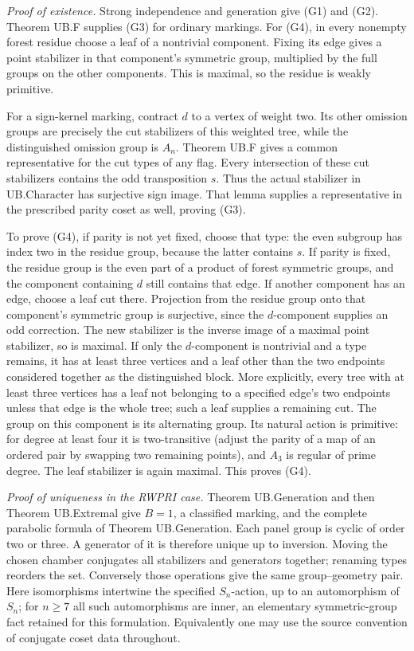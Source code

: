 \emph{Proof of existence.} Strong independence and generation give (G1) and (G2). Theorem UB.F supplies (G3) for ordinary markings. For (G4), in every nonempty forest residue choose a leaf of a nontrivial component. Fixing its edge gives a point stabilizer in that component's symmetric group, multiplied by the full groups on the other components. This is maximal, so the residue is weakly primitive.

For a sign-kernel marking, contract \(d\) to a vertex of weight two. Its other omission groups are precisely the cut stabilizers of this weighted tree, while the distinguished omission group is \(A_n\). Theorem UB.F gives a common representative for the cut types of any flag. Every intersection of these cut stabilizers contains the odd transposition \(s\). Thus the actual stabilizer in UB.Character has surjective sign image. That lemma supplies a representative in the prescribed parity coset as well, proving (G3).

To prove (G4), if parity is not yet fixed, choose that type: the even subgroup has index two in the residue group, because the latter contains \(s\). If parity is fixed, the residue group is the even part of a product of forest symmetric groups, and the component containing \(d\) still contains that edge. If another component has an edge, choose a leaf cut there. Projection from the residue group onto that component's symmetric group is surjective, since the \(d\)-component supplies an odd correction. The new stabilizer is the inverse image of a maximal point stabilizer, so is maximal. If only the \(d\)-component is nontrivial and a type remains, it has at least three vertices and a leaf other than the two endpoints considered together as the distinguished block. More explicitly, every tree with at least three vertices has a leaf not belonging to a specified edge's two endpoints unless that edge is the whole tree; such a leaf supplies a remaining cut. The group on this component is its alternating group. Its natural action is primitive: for degree at least four it is two-transitive (adjust the parity of a map of an ordered pair by swapping two remaining points), and \(A_3\) is regular of prime degree. The leaf stabilizer is again maximal. This proves (G4).

\emph{Proof of uniqueness in the RWPRI case.} Theorem UB.Generation and then Theorem UB.Extremal give \(B=1\), a classified marking, and the complete parabolic formula of Theorem UB.Generation. Each panel group is cyclic of order two or three. A generator of it is therefore unique up to inversion. Moving the chosen chamber conjugates all stabilizers and generators together; renaming types reorders the set. Conversely those operations give the same group--geometry pair. Here isomorphisms intertwine the specified \(S_n\)-action, up to an automorphism of \(S_n\); for \(n\geq7\) all such automorphisms are inner, an elementary symmetric-group fact retained for this formulation. Equivalently one may use the source convention of conjugate coset data throughout.

